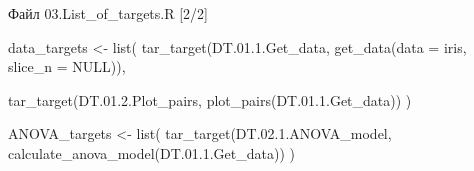 \documentclass[
  ignorenonframetext,
]{beamer}
\newenvironment{Shaded}{\begin{snugshade}}{\end{snugshade}}
\newcommand{\AttributeTok}[1]{\textcolor[rgb]{0.40,0.45,0.13}{#1}}
\newcommand{\ConstantTok}[1]{\textcolor[rgb]{0.56,0.35,0.01}{#1}}
\newcommand{\DecValTok}[1]{\textcolor[rgb]{0.68,0.00,0.00}{#1}}
\newcommand{\FloatTok}[1]{\textcolor[rgb]{0.68,0.00,0.00}{#1}}
\newcommand{\FunctionTok}[1]{\textcolor[rgb]{0.28,0.35,0.67}{#1}}
\newcommand{\NormalTok}[1]{\textcolor[rgb]{0.00,0.23,0.31}{#1}}
\newcommand{\OtherTok}[1]{\textcolor[rgb]{0.00,0.23,0.31}{#1}}
\begin{document}
\begin{frame}[fragile]{Файл 03.List\_of\_targets.R {[}2/2{]}}
\label{ux444ux430ux439ux43b-03.list_of_targets.r-22}
\begin{Shaded}
\begin{Highlighting}[]
\NormalTok{data\_targets }\OtherTok{\textless{}{-}} \FunctionTok{list}\NormalTok{(}
  \FunctionTok{tar\_target}\NormalTok{(DT.}\DecValTok{01}\NormalTok{.}\FloatTok{1.}\NormalTok{Get\_data,}
             \FunctionTok{get\_data}\NormalTok{(}\AttributeTok{data =}\NormalTok{ iris, }\AttributeTok{slice\_n =} \ConstantTok{NULL}\NormalTok{)),}

  \FunctionTok{tar\_target}\NormalTok{(DT.}\DecValTok{01}\NormalTok{.}\FloatTok{2.}\NormalTok{Plot\_pairs,}
             \FunctionTok{plot\_pairs}\NormalTok{(DT.}\DecValTok{01}\NormalTok{.}\FloatTok{1.}\NormalTok{Get\_data))}
\NormalTok{)}


\NormalTok{ANOVA\_targets }\OtherTok{\textless{}{-}} \FunctionTok{list}\NormalTok{(}
  \FunctionTok{tar\_target}\NormalTok{(DT.}\DecValTok{02}\NormalTok{.}\FloatTok{1.}\NormalTok{ANOVA\_model,}
             \FunctionTok{calculate\_anova\_model}\NormalTok{(DT.}\DecValTok{01}\NormalTok{.}\FloatTok{1.}\NormalTok{Get\_data))}
\NormalTok{)}
\end{Highlighting}
\end{Shaded}
\end{frame}
\end{document}
